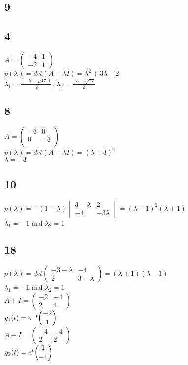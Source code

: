 \documentclass[12pt, a4paper]{IEEEtran}
\begin{document}
\begin{flushleft}
    \section{9}
    \subsection{4}
    $A=\begin{pmatrix}
        -4&1\\
        -2&1
        \end{pmatrix}$\\
    $p(\lambda)=det(A-\lambda I)=\lambda^2+3\lambda-2$\\
    $\lambda_1=\frac{(-3-\sqrt{17})}{2}$, $\lambda_2=\frac{-3-\sqrt{17}}{2}$\\

    \subsection{8}
    $A=\begin{pmatrix}
        -3&0\\
        0&-3\\
    \end{pmatrix}$\\
    $p(\lambda)=det(A-\lambda I)=(\lambda +3)^2$\\
    $\lambda=-3$

    \subsection{10}
    $p(\lambda)=-(1-\lambda)\begin{vmatrix}
        3-\lambda&2\\
        -4&-3\lambda
    \end{vmatrix}=(\lambda-1)^2(\lambda+1)$\\
    $\lambda_1=-1$ and $\lambda_2=1$
    
    \subsection{18}
    $p(\lambda)=det\begin{pmatrix}
        -3-\lambda&-4\\
        2&3-\lambda
    \end{pmatrix}=(\lambda+1)(\lambda-1)$\\
    $\lambda_1=-1$ and $\lambda_2=1$\\
    $A+I=\begin{pmatrix}
        -2&-4\\
        2&4
    \end{pmatrix}$\\
    $y_1(t)=e^{-t}\dbinom{-2}{1}$\\
    $A-I=\begin{pmatrix}
        -4&-4\\
        2&2
    \end{pmatrix}$\\
    $y_2(t)=e^t\dbinom{1}{-1}$\\
    

\end{flushleft}
\end{document}
